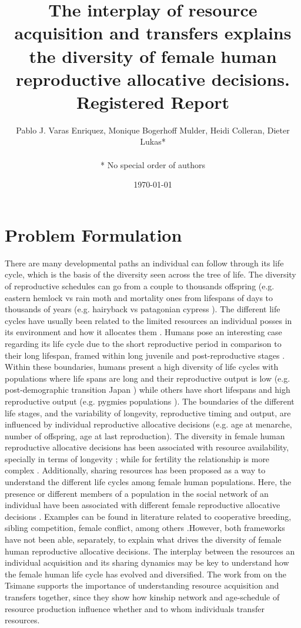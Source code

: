 \documentclass{article}
\title{The interplay of resource acquisition and transfers explains the diversity of female human reproductive allocative decisions.
\\
Registered Report}
\author{Pablo J. Varas Enriquez, Monique Bogerhoff Mulder, Heidi Colleran, Dieter Lukas*\\\\
* No special order of authors}
\date{\today}
\begin{document}
\maketitle

\tableofcontents

\section{Problem Formulation}

There are many developmental paths an individual can follow through its life cycle, which is the basis of the diversity seen across the tree of life. The diversity of reproductive schedules can go from a couple to thousands offspring (e.g. eastern hemlock vs rain moth \citep{tindale1932revision,van2017lifetime} and mortality ones from lifespans of days to thousands of years (e.g. hairyback vs patagonian cypress \citep{balsamo1988life,lara19933620}). The different life cycles have usually been related to the limited resources an individual posses in its environment and how it allocates them \citep{stearns2000life}. Humans pose an interesting case regarding its life cycle due to the short reproductive period in comparison to their long lifespan, framed within long juvenile and post-reproductive stages \citep{kaplan2000theory}. Within these boundaries, humans present a high diversity of life cycles with populations where life spans are long and their reproductive output is low (e.g. post-demographic transition Japan \citep{de2017maximum}) while others have short lifespans and high reproductive output (e.g. pygmies populations \citep{migliano2007life}).  The boundaries of the different life stages, and the variability of longevity, reproductive timing and output, are influenced by individual reproductive allocative decisions (e.g. age at menarche, number of offspring, age at last reproduction). The diversity in female human reproductive allocative decisions has been associated with resource availability, specially in terms of longevity \citep{kaplan2003embodied}; while for fertility the relationship is more complex \citep{mulder1998demographic,sear2016understanding}. Additionally, sharing resources has been proposed as a way to understand the different life cycles among female human populations. Here, the presence or different members of a population in the social network of an individual have been associated with different female reproductive allocative decisions \citep{sear2011much}. Examples can be found in literature related to cooperative breeding, sibling competition, female conflict, among others \citep{ivey2000cooperative,nitsch2013elder,mace2012female}.However, both frameworks have not been able, separately, to explain what drives the diversity of female human reproductive allocative decisions. The interplay between the resources an individual acquisition and its sharing dynamics may be key to understand how the female human life cycle has evolved and diversified. The work from \cite{hooper2015inclusive} on the Tsimane supports the importance of understanding resource acquisition and transfers together, since they show how kinship network and age-schedule of resource production influence whether and to whom individuals transfer resources. 
\end{document}

